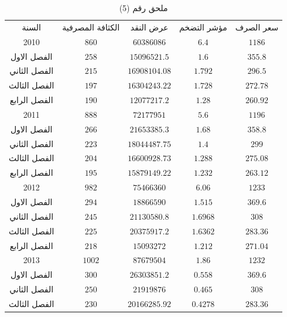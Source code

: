\documentclass[10pt,a4paper]{report}
\begin{document}
	\begin{longtable}{|c|c|c|c|c|}
	\captionsetup{font=Large}
	\caption*{ملحق رقم (5)} \\
	\hline
	\rowcolor[HTML]{DAE8FC} 
	السنة        & الكثافة المصرفية & عرض النقد     & مؤشر التضخم & سعر الصرف \\ \hline
	2010         & $860$            & $60386086$    & $6.4$       & $1186$    \\ \hline
	الفصل الاول  & $258$            & $15096521.5$  & $1.6$       & $355.8$   \\ \hline
	الفصل الثاني & $215$            & $16908104.08$ & $1.792$     & $296.5$   \\ \hline
	الفصل الثالث & $197$            & $16304243.22$ & $1.728$     & $272.78$  \\ \hline
	الفصل الرابع & $190$            & $12077217.2$  & $1.28$      & $260.92$  \\ \hline
	2011         & $888$            & $72177951$    & $5.6$       & $1196$    \\ \hline
	الفصل الاول  & $266$            & $21653385.3$  & $1.68$      & $358.8$   \\ \hline
	الفصل الثاني & $223$            & $18044487.75$ & $1.4$       & $299$     \\ \hline
	الفصل الثالث & $204$            & $16600928.73$ & $1.288$     & $275.08$  \\ \hline
	الفصل الرابع & $195$            & $15879149.22$ & $1.232$     & $263.12$  \\ \hline
	2012         & $982$            & $75466360$    & $6.06$      & $1233$    \\ \hline
	الفصل الاول  & $294$            & $18866590$    & $1.515$     & $369.6$   \\ \hline
	الفصل الثاني & $245$            & $21130580.8$  & $1.6968$    & $308$     \\ \hline
	الفصل الثالث & $225$            & $20375917.2$  & $1.6362$    & $283.36$  \\ \hline
	الفصل الرابع & $218$            & $15093272$    & $1.212$     & $271.04$  \\ \hline
	2013         & $1002$           & $87679504$    & $1.86$      & $1232$    \\ \hline
	الفصل الاول  & $300$            & $26303851.2$  & $0.558$     & $369.6$   \\ \hline
	الفصل الثاني & $250$            & $21919876$    & $0.465$     & $308$     \\ \hline
	الفصل الثالث & $230$            & $20166285.92$ & $0.4278$    & $283.36$  \\ \hline

\end{longtable}
\end{document}
